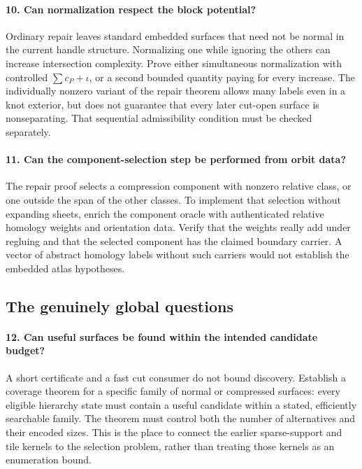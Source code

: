 \paragraph{10. Can normalization respect the block potential?}
Ordinary repair leaves standard embedded surfaces that need not be normal
in the current handle structure.  Normalizing one while ignoring the
others can increase intersection complexity.  Prove either simultaneous
normalization with controlled $\sum c_P+\iota$, or a second bounded
quantity paying for every increase.  The individually nonzero variant
of the repair theorem allows many labels even in a knot exterior, but
does not guarantee that every later cut-open surface is nonseparating.
That sequential admissibility condition must be checked separately.

\paragraph{11. Can the component-selection step be performed from orbit data?}
The repair proof selects a compression component with nonzero relative
class, or one outside the span of the other classes.  To implement that
selection without expanding sheets, enrich the component oracle with
authenticated relative homology weights and orientation data.  Verify
that the weights really add under regluing and that the selected component
has the claimed boundary carrier.  A vector of abstract homology labels
without such carriers would not establish the embedded atlas hypotheses.

\subsection{The genuinely global questions}

\paragraph{12. Can useful surfaces be found within the intended candidate budget?}
A short certificate and a fast cut consumer do not bound discovery.
Establish a coverage theorem for a specific family of normal or compressed
surfaces: every eligible hierarchy state must contain a useful candidate
within a stated, efficiently searchable family.  The theorem must control
both the number of alternatives and their encoded sizes.  This is the
place to connect the earlier sparse-support and tile kernels to the
selection problem, rather than treating those kernels as an enumeration
bound.

